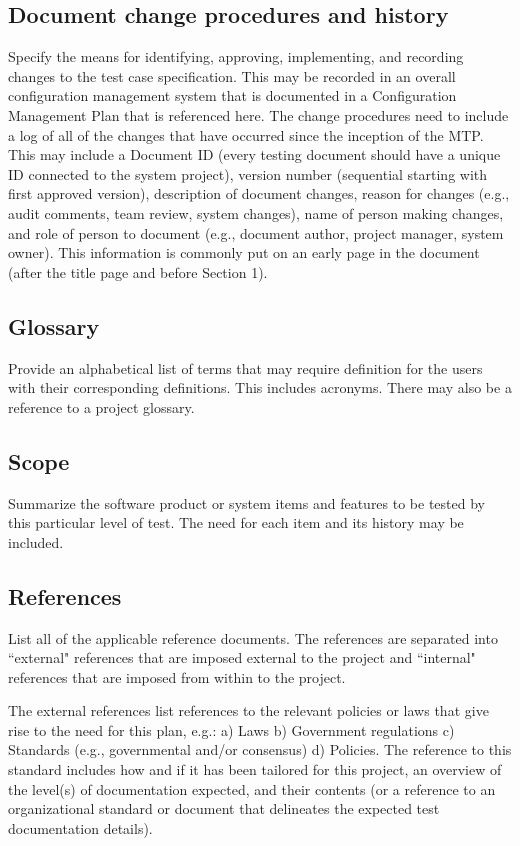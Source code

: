 \documentclass{./template/openetcs_report}
\begin{document}
\subsection{Document change procedures and history}
Specify the means for identifying, approving, implementing, and recording
changes to the test case specification. 
This may be recorded in an overall configuration management
system that is documented in a Configuration Management Plan that is referenced
here. 
The change procedures need to include a log of all of the changes that
have occurred since the inception of the MTP. 
This may include a Document ID
(every testing document should have a unique ID connected to the system
project), version number (sequential starting with first approved version),
description of document changes, reason for changes (e.g., audit comments, team
review, system changes), name of person making changes, and role of person to
document (e.g., document author, project manager, system owner). 
This information is commonly put on an early page in the document (after the
title page and before Section 1).

\subsection{Glossary}
Provide an alphabetical list of terms that may require definition for the users
with their corresponding definitions. This includes acronyms. 
There may also be a reference to a project glossary.

\subsection{Scope}
Summarize the software product or system items and features to be tested by this
particular level of test. 
The need for each item and its history may be included.

\subsection{References}
List all of the applicable reference documents. The references are separated
into ``external" references that are imposed external to the project and
``internal" references that are imposed from within to the project.

The external references
list references to the relevant policies or laws that give rise to the need for
this plan, e.g.: a) Laws b) Government regulations c) Standards (e.g.,
governmental and/or consensus) d) Policies. 
The reference to this standard
includes how and if it has been tailored for this project, an overview of the
level(s) of documentation expected, and their contents (or a reference to an
organizational standard or document that delineates the expected test
documentation details).
\end{document}
